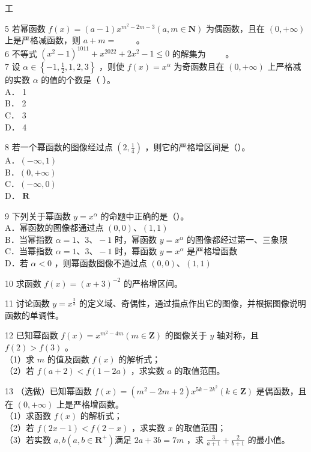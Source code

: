 \documentclass[10pt]{article}
\begin{document}
工

5 若幂函数 \(f(x)=(a-1) x^{m^{2}-2 m-3}(a, m \in \mathbf{N})\) 为偶函数，且在 \((0,+\infty)\) 上是严格减函数，则 \(a+m=\) \(\qquad\)。\\
6 不等式 \(\left(x^{2}-1\right)^{1011}+x^{2022}+2 x^{2}-1 \leqslant 0\) 的解集为 \(\qquad\)。\\
7 设 \(\alpha \in\left\{-1, \frac{1}{2}, 1,2,3\right\}\) ，则使 \(f(x)=x^{\alpha}\) 为奇函数且在 \((0,+\infty)\) 上严格减的实数 \(\alpha\) 的值的个数是（ ）。\\
A． 1\\
B． 2\\
C． 3\\
D． 4

8 若一个幂函数的图像经过点 \(\left(2, \frac{1}{4}\right)\) ，则它的严格增区间是（）。\\
A．\((-\infty, 1)\)\\
B．\((0,+\infty)\)\\
C．\((-\infty, 0)\)\\
D． \(\mathbf{R}\)

9 下列关于幂函数 \(y=x^{\alpha}\) 的命题中正确的是（）。\\
A．幂函数的图像都通过点 \((0,0) 、(1,1)\)\\
B．当幂指数 \(\alpha=1 、 3 、-1\) 时，幂函数 \(y=x^{\alpha}\) 的图像都经过第一、三象限\\
C．当幂指数 \(\alpha=1 、 3 、-1\) 时，幂函数 \(y=x^{\alpha}\) 是严格增函数\\
D．若 \(\alpha<0\) ，则幂函数图像不通过点 \((0,0) 、(1,1)\)

10 求函数 \(f(x)=(x+3)^{-2}\) 的严格增区间。

11 讨论函数 \(y=x^{\frac{2}{3}}\) 的定义域、奇偶性，通过描点作出它的图像，并根据图像说明函数的单调性。

12 已知幂函数 \(f(x)=x^{m^{2}-4 m}(m \in \mathbf{Z})\) 的图像关于 \(y\) 轴对称，且 \(f(2)>f(3)\) 。\\
（1）求 \(m\) 的值及函数 \(f(x)\) 的解析式；\\
（2）若 \(f(a+2)<f(1-2 a)\) ，求实数 \(a\) 的取值范围。

13 （选做）已知幂函数 \(f(x)=\left(m^{2}-2 m+2\right) x^{5 k-2 k^{2}}(k \in \mathbf{Z})\) 是偶函数，且在 \((0,+\infty)\) 上是严格增函数。\\
（1）求函数 \(f(x)\) 的解析式；\\
（2）若 \(f(2 x-1)<f(2-x)\) ，求实数 \(x\) 的取值范围；\\
（3）若实数 \(a, b\left(a, b \in \mathbf{R}^{+}\right)\)满足 \(2 a+3 b=7 m\) ，求 \(\frac{3}{a+1}+\frac{2}{b+1}\) 的最小值。
\end{document}
